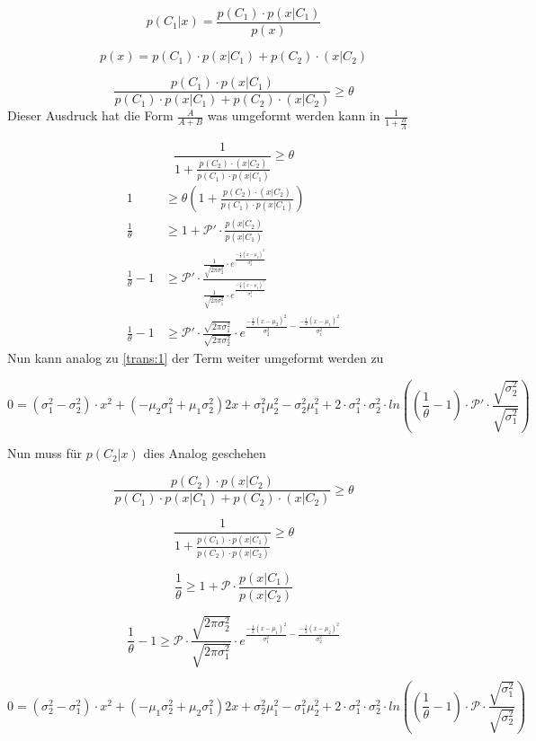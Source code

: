 \documentclass{article}
\begin{document}
$$ p(C_1 | x) = \frac{p(C_1) \cdot p(x| C_1)}{p(x)}$$

$$p(x) = p(C_1) \cdot p(x | C_1) + p(C_2) \cdotp(x| C_2) $$

$$ \frac{p(C_1) \cdot p(x| C_1)}{p(C_1) \cdot p(x | C_1) + p(C_2) \cdotp(x| C_2)} \ge \theta$$
Dieser Ausdruck hat die Form $\frac{A}{A+B}$ was umgeformt werden kann in $\frac{1}{1+\frac{B}{A}}$


$$ \frac{1}{1+\frac{p(C_2) \cdotp(x| C_2)}{p(C_1) \cdot p(x| C_1)}} \ge \theta$$
\begin{align}
1 &\ge \theta (1+\frac{p(C_2) \cdotp(x| C_2)}{p(C_1) \cdot p(x| C_1)}) 
\\
\frac{1}{\theta} &\ge 1+ \mathcal{P}' \cdot \frac{p(x| C_2)}{ p(x| C_1)}
\\
 \frac{1}{\theta} - 1 &\ge
\mathcal{P}' \cdot \frac{\frac{1}{\sqrt{2\pi \sigma^{2}_2}} \cdot e^{\frac{-\frac{1}{2}(x-\mu_2)^2}{\sigma_{2}^2}}}{\frac{1}{\sqrt{2\pi \sigma^{2}_1}} \cdot e^{\frac{-\frac{1}{2}(x-\mu_1)^2}{\sigma_{1}^2}}} 
\\
  \frac{1}{\theta} - 1 &\ge 
\mathcal{P}' \cdot
\frac{\sqrt{2\pi \sigma^{2}_1}}{\sqrt{2\pi \sigma^{2}_2}}
 \cdot e^{\frac{-\frac{1}{2}(x-\mu_2)^2}{\sigma_{2}^2} - \frac{-\frac{1}{2}(x-\mu_1)^2}{\sigma_{1}^2}}
\end{align}
Nun kann analog zu \ref{trans:1} der Term weiter umgeformt werden zu 

$$ 0 = (\sigma_{1}^2 - \sigma_{2}^2) \cdot x^2 +
(-\mu_{2}\sigma_{1}^2 + \mu_{1} \sigma_{2}^2)2x 
+ \sigma_{1}^2 \mu_{2}^2 - \sigma_{2}^2\mu_{1}^2 
+ 2 \cdot \sigma_{1}^2 
\cdot \sigma_{2}^2 
\cdot ln((\frac{1}{\theta} - 1) 
\cdot \mathcal{P}' 
\cdot \frac{\sqrt{\sigma^{2}_2}}{\sqrt{ \sigma^{2}_1}}) 
$$

Nun muss für $p(C_2 | x)$ dies Analog geschehen

$$ \frac{p(C_2) \cdot p(x| C_2)}{p(C_1) \cdot p(x | C_1) + p(C_2) \cdotp(x| C_2)} \ge \theta$$

$$ \frac{1}{1+ \frac{p(C_1) \cdot p(x | C_1)}{p(C_2) \cdot p(x| C_2)}} \ge \theta$$

$$ \frac{1}{\theta} \ge 1+ \mathcal{P} \cdot \frac{p(x| C_1)}{ p(x| C_2)}$$ 


$$  \frac{1}{\theta} - 1 \ge 
\mathcal{P} \cdot
\frac{\sqrt{2\pi \sigma^{2}_2}}{\sqrt{2\pi \sigma^{2}_1}}
\cdot e^{\frac{-\frac{1}{2}(x-\mu_1)^2}{\sigma_{1}^2} - \frac{-\frac{1}{2}(x-\mu_2)^2}{\sigma_{2}^2}}$$


$$ 0 = (\sigma_{2}^2 - \sigma_{1}^2) \cdot x^2 +
(-\mu_{1}\sigma_{2}^2 + \mu_{2} \sigma_{1}^2)2x 
+ \sigma_{2}^2 \mu_{1}^2 - \sigma_{1}^2\mu_{2}^2 
+ 2 \cdot \sigma_{1}^2 
\cdot \sigma_{2}^2 
\cdot ln((\frac{1}{\theta} - 1) 
\cdot \mathcal{P} 
\cdot \frac{\sqrt{\sigma^{2}_1}}{\sqrt{ \sigma^{2}_2}}) 
$$
\end{document}
